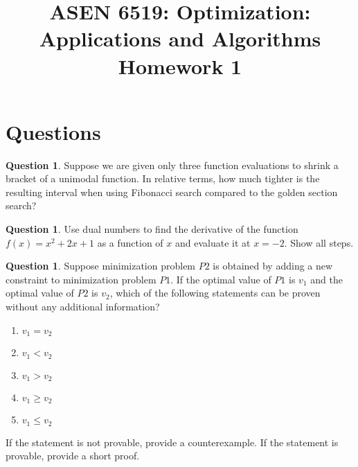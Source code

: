 \documentclass{article}
\title{ASEN 6519: Optimization: Applications and Algorithms\\
       Homework 1}
\theoremstyle{definition}
\newtheorem{question}[thm]{Question}
\begin{document}
\maketitle

\section{Questions}

\begin{question}
    Suppose we are given only three function evaluations to shrink a bracket of a unimodal function. In relative terms, how much tighter is the resulting interval when using Fibonacci search compared to the golden section search?
\end{question}

\begin{question}
    Use dual numbers to find the derivative of the function $f(x) = x^2 + 2x + 1$ as a function of $x$ and evaluate it at $x=-2$. Show all steps.
\end{question}

\begin{question}
    Suppose minimization problem $P2$ is obtained by adding a new constraint to minimization problem $P1$. If the optimal value of $P1$ is $v_1$ and the optimal value of $P2$ is $v_2$, which of the following statements can be proven without any additional information?
    \begin{enumerate}[label=(\alph*)]
        \item $v_1 = v_2$
        \item $v_1 < v_2$
        \item $v_1 > v_2$
        \item $v_1 \geq v_2$
        \item $v_1 \leq v_2$
    \end{enumerate}
    If the statement is not provable, provide a counterexample. If the statement is provable, provide a short proof.
\end{question}
\end{document}
